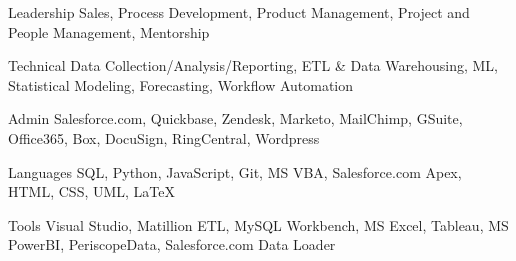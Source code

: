 


\begin{cvskills}

\cvskill
{Leadership} %
{Sales, Process Development, Product Management, Project and People Management, Mentorship} %


\cvskill
{Technical} %
{Data Collection/Analysis/Reporting, ETL \& Data Warehousing, ML, Statistical Modeling, Forecasting, Workflow Automation} %


\cvskill
{Admin} %
{Salesforce.com, Quickbase, Zendesk, Marketo, MailChimp, GSuite, Office365, Box, DocuSign, RingCentral, Wordpress} %


\cvskill
{Languages} %
{SQL, Python, JavaScript, Git, MS VBA, Salesforce.com Apex, HTML, CSS, UML, \LaTeX } %


\cvskill
{Tools} %
{Visual Studio, Matillion ETL, MySQL Workbench, MS Excel, Tableau, MS PowerBI, PeriscopeData, Salesforce.com Data Loader} %

\end{cvskills}